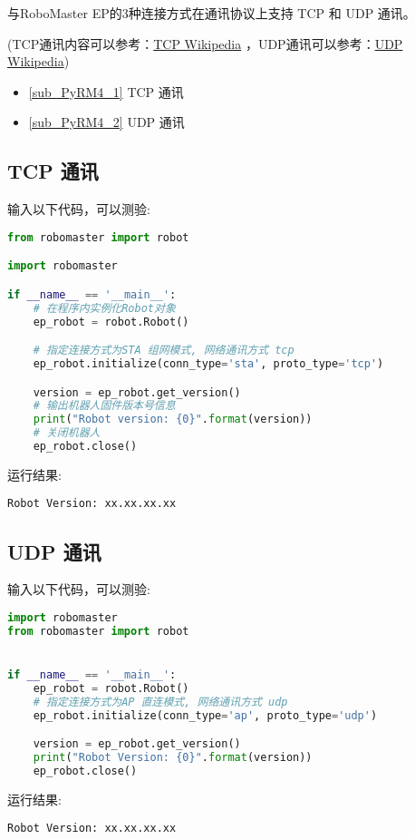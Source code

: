 
与RoboMaster EP的3种连接方式在通讯协议上支持 TCP 和 UDP 通讯。

(TCP通讯内容可以参考：\href{https://en.wikipedia.org/wiki/Transmission_Control_Protocol}{TCP Wikipedia} ，UDP通讯可以参考：\href{https://en.wikipedia.org/wiki/User_Datagram_Protocol}{UDP Wikipedia})

\begin{itemize}
\item \autoref{sub_PyRM4_1} TCP 通讯
\item \autoref{sub_PyRM4_2} UDP 通讯
\end{itemize}

\subsection{TCP 通讯}\label{sub_PyRM4_1}

输入以下代码，可以测验:

\begin{lstlisting}[language=python]
from robomaster import robot

import robomaster

if __name__ == '__main__':
    # 在程序内实例化Robot对象
    ep_robot = robot.Robot()

    # 指定连接方式为STA 组网模式, 网络通讯方式 tcp
    ep_robot.initialize(conn_type='sta', proto_type='tcp')

    version = ep_robot.get_version()
    # 输出机器人固件版本号信息
    print("Robot version: {0}".format(version))
    # 关闭机器人
    ep_robot.close()

\end{lstlisting}

运行结果:
\begin{lstlisting}[language=pythonC]
Robot Version: xx.xx.xx.xx
\end{lstlisting}

\subsection{UDP 通讯}\label{sub_PyRM4_2}

输入以下代码，可以测验:

\begin{lstlisting}[language=python]
import robomaster
from robomaster import robot


if __name__ == '__main__':
    ep_robot = robot.Robot()
    # 指定连接方式为AP 直连模式, 网络通讯方式 udp
    ep_robot.initialize(conn_type='ap', proto_type='udp')

    version = ep_robot.get_version()
    print("Robot Version: {0}".format(version))
    ep_robot.close()
\end{lstlisting}

运行结果:
\begin{lstlisting}[language=pythonC]
Robot Version: xx.xx.xx.xx
\end{lstlisting}
